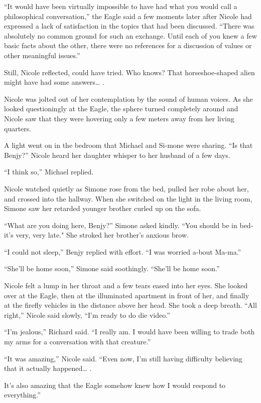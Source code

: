 \documentclass[]{article}
\begin{document}
{“It would have been virtually impossible to have had what you would call a philosophical conversation,” the Eagle said a few moments later after Nicole had expressed a lack of satisfaction in the topics that had been discussed.  “There was absolutely no common ground for such an exchange.  Until each of you knew a few basic facts about the other, there were no references for a discussion of values or other meaningful issues.”

Still, Nicole reflected, could have tried.  Who knows? That horseshoe-shaped alien might have had some answers… .

Nicole was jolted out of her contemplation by the sound of human voices.  As she looked questioningly at the Eagle, the sphere turned completely around and Nicole saw that they were hovering only a few meters away from her living quarters.

A light went on in the bedroom that Michael and Si-mone were sharing.  “Is that Benjy?” Nicole heard her daughter whisper to her husband of a few days.

“I think so,” Michael replied.

Nicole watched quietly as Simone rose from the bed, pulled her robe about her, and crossed into the hallway.  When she switched on the light in the living room, Simone saw her retarded younger brother curled up on the sofa.

“What are you doing here, Benjy?” Simone asked kindly.  “You should be in bed-it’s very, very late."  She stroked her brother’s anxious brow.

“I could not sleep,” Benjy replied with effort.  “I was worried a-bout Ma-ma.”

“She’ll be home soon,” Simone said soothingly.  “She’ll be home soon.”

Nicole felt a lump in her throat and a few tears eased into her eyes.  She looked over at the Eagle, then at the illuminated apartment in front of her, and finally at the firefly vehicles in the distance above her head.  She took a deep breath.  “All right,” Nicole said slowly, “I’m ready to do die video.”

“I’m jealous,” Richard said.  “I really am.  I would have been willing to trade both my arms for a conversation with that creature.”

“It was amazing,” Nicole said.  “Even now, I’m still having difficulty believing that it actually happened… .

It’s also amazing that the Eagle somehow knew how I would respond to everything.”

}
\end{document}
